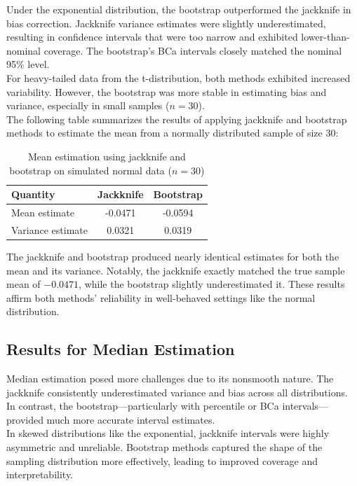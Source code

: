 \documentclass{article}
\begin{document}
Under the exponential distribution, the bootstrap outperformed the jackknife in bias correction. Jackknife variance estimates were slightly underestimated, resulting in confidence intervals that were too narrow and exhibited lower-than-nominal coverage. The bootstrap's BCa intervals closely matched the nominal 95\% level.\\

For heavy-tailed data from the t-distribution, both methods exhibited increased variability. However, the bootstrap was more stable in estimating bias and variance, especially in small samples (\( n=30 \)).\\

The following table summarizes the results of applying jackknife and bootstrap methods to estimate the mean from a normally distributed sample of size 30:

\begin{table}[h!]
\centering
\caption{Mean estimation using jackknife and bootstrap on simulated normal data ($n=30$)}
\begin{tabular}{|l|c|c|}
\hline
\textbf{Quantity} & \textbf{Jackknife} & \textbf{Bootstrap} \\
\hline
Mean estimate     & -0.0471 & -0.0594 \\
Variance estimate &  0.0321 &  0.0319 \\
\hline
\end{tabular}
\label{tab:mean-normal}
\end{table}

The jackknife and bootstrap produced nearly identical estimates for both the mean and its variance. Notably, the jackknife exactly matched the true sample mean of  $-0.0471$, while the bootstrap slightly underestimated it. These results affirm both methods’ reliability in well-behaved settings like the normal distribution.

\subsection{Results for Median Estimation}

Median estimation posed more challenges due to its nonsmooth nature. The jackknife consistently underestimated variance and bias across all distributions. In contrast, the bootstrap—particularly with percentile or BCa intervals—provided much more accurate interval estimates. \\

In skewed distributions like the exponential, jackknife intervals were highly asymmetric and unreliable. Bootstrap methods captured the shape of the sampling distribution more effectively, leading to improved coverage and interpretability.\\
\end{document}
